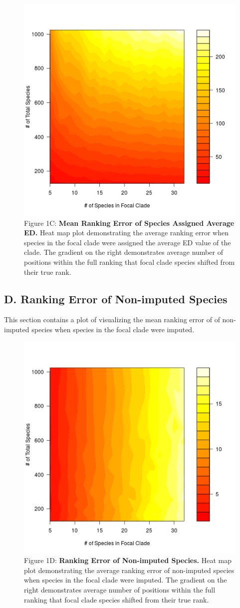 \documentclass[12pt,english]{article}
\begin{document}
\begin{figure}[!ht]
  \center
  \includegraphics[width=.5\textwidth]{rankingError_avgEDforClade.png}
  \caption*{Figure 1C: \textbf{Mean Ranking Error of Species Assigned Average ED.} Heat map
  plot demonstrating the average ranking error when species in the focal clade
  were assigned the average ED value of the clade. The gradient on the right
  demonstrates average number of positions within the full ranking that focal
  clade species shifted from their true rank.}
\end{figure}
\clearpage
\subsection*{D. Ranking Error of Non-imputed Species}

This section contains a plot of visualizing the mean ranking error of of
non-imputed species when species in the focal clade were imputed.

\begin{figure}[!ht]
  \center
  \includegraphics[width=.5\textwidth]{rankingError_remainingSpp.png}
  \caption*{Figure 1D: \textbf{Ranking Error of Non-imputed Species.} Heat map plot
  demonstrating the average ranking error of non-imputed species when species in
  the focal clade were imputed. The gradient on the right demonstrates average
  number of positions within the full ranking that focal clade species shifted
  from their true rank.}
\end{figure}
\end{document}
